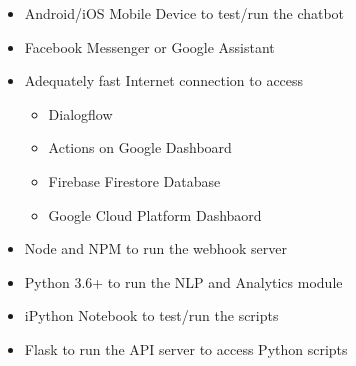 \begin{itemize}
    \item Android/iOS Mobile Device to test/run the chatbot
    \item Facebook Messenger or Google Assistant
    \item Adequately fast Internet connection to access
    \begin{itemize}    
        \item Dialogflow
        \item Actions on Google Dashboard
        \item Firebase Firestore Database
        \item Google Cloud Platform Dashbaord
    \end{itemize}
    \item Node and NPM to run the webhook server
    \item Python 3.6+ to run the NLP and Analytics module
    \item iPython Notebook to test/run the scripts
    \item Flask to run the API server to access Python scripts
\end{itemize}